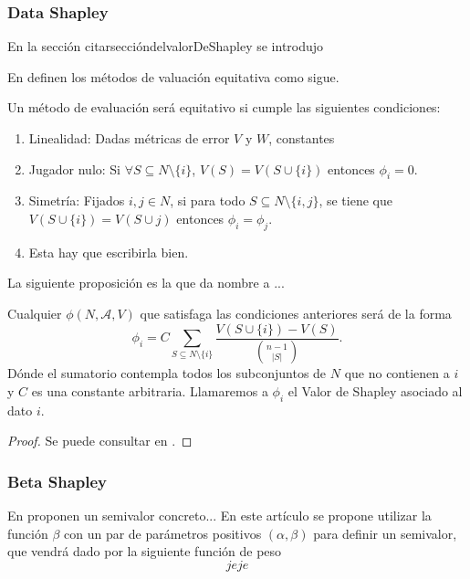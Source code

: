 \subsubsection{Data Shapley}
En la sección citarseccióndelvalorDeShapley se introdujo 

En {\cite{shapleyValue}} definen los métodos de valuación equitativa
como sigue.

\begin{definition}
  Un método de evaluación será equitativo si cumple las siguientes
  condiciones:
  \begin{enumerate}
    \item Linealidad: Dadas métricas de error $V$ y $W$, constantes
    
    \item Jugador nulo: Si $\forall S \subseteq N \setminus
    \{ i \}$, $V (S) = V (S \cup \{ i \})$ entonces $\phi_i = 0$.
    
    \item Simetría: Fijados $i, j \in N$, si para todo $S \subseteq N
    \setminus \{ i, j \}$, se tiene que $V (S \cup \{ i \}) = V (S \cup j)$
    entonces $\phi_i = \phi_j$.
    
    \item Esta hay que escribirla bien.
  \end{enumerate}
\end{definition}

La siguiente proposición es la que da nombre a ...

\begin{proposition}
  Cualquier $\phi (N, \mathcal{A}, V)$ que satisfaga las condiciones
  anteriores será de la forma
  \[
  \phi_i = C \sum_{S \subseteq N \setminus \{ i \}}
  \frac{V (S \cup \{ i\}) - V (S)}{\binom{n - 1}{| S |}} .
  \]
  Dónde el sumatorio contempla todos los subconjuntos de $N$ que no
  contienen a $i$ y $C$ es una constante arbitraria. Llamaremos a $\phi_i$ el
  Valor de Shapley asociado al dato $i$.
\end{proposition}

\begin{proof}
  Se puede consultar en {\cite{shapleyValue}}.
\end{proof}


\subsubsection{Beta Shapley}
En \cite{betaShapley} proponen un semivalor concreto... 
En este artículo se propone utilizar la función $\beta$ con
un par de parámetros positivos $(\alpha,\beta)$ para definir
un semivalor, que vendrá dado por la siguiente función
de peso
\[
  jeje
\]

